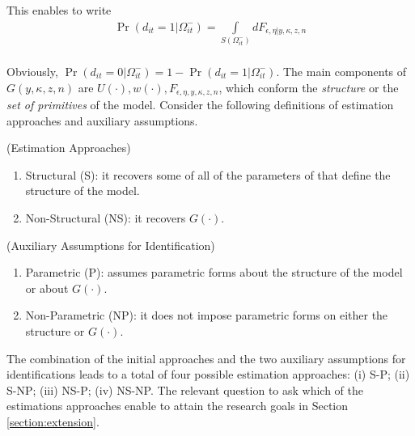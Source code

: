 \indent This enables to write
\begin{eqnarray}
\Pr \left( d_{it} = 1 | \Omega_{it}^{-} \right) = \int \limits _{S \left(  \Omega_{it}^- \right)} d F _{\epsilon, \eta |  y, \kappa, z, n} \\
\end{eqnarray}

\noindent Obviously, $\Pr \left( d_{it} = 0 | \Omega_{it}^- \right) = 1 - \Pr \left( d_{it} = 1 | \Omega_{it}^- \right)$. The main components of $G \left( y, \kappa, z, n \right)$ are $U(\cdot), w(\cdot), F _{\epsilon, \eta,  y, \kappa, z, n}$, which conform the \emph{structure} or the \emph{set of primitives} of the model. Consider the following definitions of estimation approaches and auxiliary assumptions.

\begin{definition} (Estimation Approaches) \label{definition:ea}
\begin{enumerate}
\item Structural (S): it recovers some of all of the parameters of that define the structure of the model.
\item Non-Structural (NS): it recovers $G(\cdot)$.
\end{enumerate}
\end{definition}

\begin{definition} (Auxiliary Assumptions for Identification) \label{definition:aa}
\begin{enumerate}
\item Parametric (P): assumes parametric forms about the structure of the model or about $G(\cdot)$.
\item Non-Parametric (NP): it does not impose parametric forms on either the structure or $G(\cdot)$.
\end{enumerate}
\end{definition}

\indent The combination of the initial approaches and the two auxiliary assumptions for identifications leads to a total of four possible estimation approaches: (i) S-P; (ii) S-NP; (iii) NS-P; (iv) NS-NP. The relevant question to ask which of the estimations approaches enable to attain the research goals in Section \ref{section:extension}.

